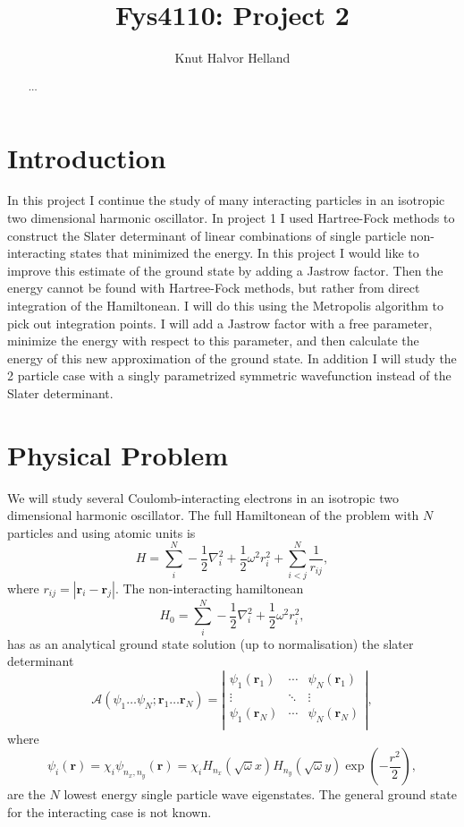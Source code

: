 \documentclass[a4paper,English,10pt]{article}
\title{Fys4110: Project 2}
\author{Knut Halvor Helland}
\newcommand{\bb}[1]{\boldsymbol{#1}}
\newcommand{\be}{\begin{equation}}
\newcommand{\ee}{\end{equation}}
\newcommand{\f}{\frac}
\begin{document}
\maketitle{}
\begin{abstract}
$\ldots$
\end{abstract}

\tableofcontents
\listoftables

\section{Introduction}
In this project I continue the study of many interacting particles in an isotropic two dimensional harmonic oscillator.
In project 1 \cite{proj1} I used Hartree-Fock methods to construct the Slater determinant of linear combinations of single
particle non-interacting states that minimized the energy. In this project I would like to improve this estimate of the ground state
by adding a Jastrow factor. Then the energy cannot be found with Hartree-Fock methods, but rather from direct integration of the Hamiltonean.
I will do this using the Metropolis algorithm to pick out integration points.
I will add a Jastrow factor with a free parameter, minimize the energy with respect to this parameter, and
then calculate the energy of this new approximation of the ground state.
In addition I will study the 2 particle case with a singly parametrized symmetric wavefunction instead of the Slater determinant.


\section{Physical Problem}
We will study several Coulomb-interacting electrons in an isotropic two dimensional harmonic oscillator.
The full Hamiltonean of the problem with $N$ particles and using atomic units is
\be
H = \sum_i^N -\f{1}{2}\nabla^2_i + \f{1}{2}\omega^2r^2_i + \sum_{i<j}^N\f{1}{r_{ij}}, \label{ham}
\ee
where $r_{ij} = |\bb{r}_i-\bb{r}_j|$.
The non-interacting hamiltonean
\be
H_0 = \sum_i^N -\f{1}{2}\nabla^2_i + \f{1}{2}\omega^2r^2_i,\label{ham0}
\ee
has as an analytical ground state solution (up to normalisation) the slater determinant
\be
\mathcal{A}\left(\psi_1\ldots\psi_N;\bb{r}_1\ldots\bb{r}_N\right) =
\left|\begin{matrix}
  \psi_1(\bb{r}_1)&\cdots&\psi_N(\bb{r}_1)\\
  \vdots&\ddots&\vdots\\
  \psi_1(\bb{r}_N)&\cdots&\psi_N(\bb{r}_N)\\
  \end{matrix}\right|,
\ee
where
\be
\psi_i(\bb{r}) = \chi_i\psi_{n_x,n_y}(\bb{r}) = \chi_iH_{n_x}(\sqrt{\omega}x)H_{n_y}(\sqrt{\omega}y)\exp(-\f{r^2}{2}),\label{spwf}
\ee
are the $N$ lowest energy single particle wave eigenstates.
The general ground state for the interacting case is not known.
\end{document}
